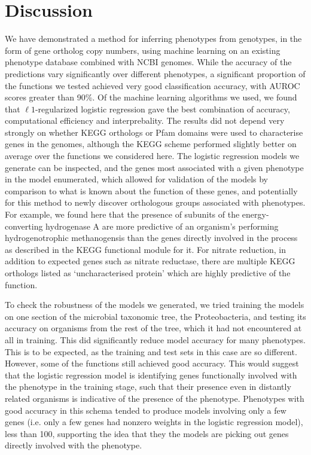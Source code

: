 \documentclass[10pt,letterpaper]{article}
\begin{document}
\section*{Discussion}
We have demonstrated a method for inferring phenotypes from genotypes, in the form of gene ortholog copy numbers, using machine learning on an existing phenotype database combined with NCBI genomes. While the accuracy of the predictions vary significantly over different phenotypes, a significant proportion of the functions we tested achieved very good classification accuracy, with AUROC scores greater than 90\%. Of the machine learning algorithms we used, we found that $\ell1$-regularized logistic regression gave the best combination of accuracy, computational efficiency and interprebality. The results did not depend very strongly on whether KEGG orthologs or Pfam domains were used to characterise genes in the genomes, although the KEGG scheme performed slightly better on average over the functions we considered here. The logistic regression models we generate can be inspected, and the genes most associated with a given phenotype in the model enumerated, which allowed for validation of the models by comparison to what is known about the function of these genes, and potentially for this method to newly discover orthologous groups associated with phenotypes. For example, we found here that the presence of subunits of the energy-converting hydrogenase A are more predictive of an organism's performing hydrogenotrophic methanogensis than the genes directly involved in the process as described in the KEGG functional module for it. For nitrate reduction, in addition to expected genes such as nitrate reductase, there are multiple KEGG orthologs listed as `uncharacterised protein' which are highly predictive of the function.

To check the robustness of the models we generated, we tried training the models on one section of the microbial taxonomic tree, the Proteobacteria, and testing its accuracy on organisms from the rest of the tree, which it had not encountered at all in training. This did significantly reduce model accuracy for many phenotypes. This is to be expected, as the training and test sets in this case are so different. However, some of the functions still achieved good accuracy. This would suggest that the logistic regression model is identifying genes functionally involved with the phenotype in the training stage, such that their presence even in distantly related organisms is indicative of the presence of the phenotype. Phenotypes with good accuracy in this schema tended to produce models involving only a few genes (i.e. only a few genes had nonzero weights in the logistic regression model), less than 100, supporting the idea that they the models are picking out genes directly involved with the phenotype. %
\end{document}
